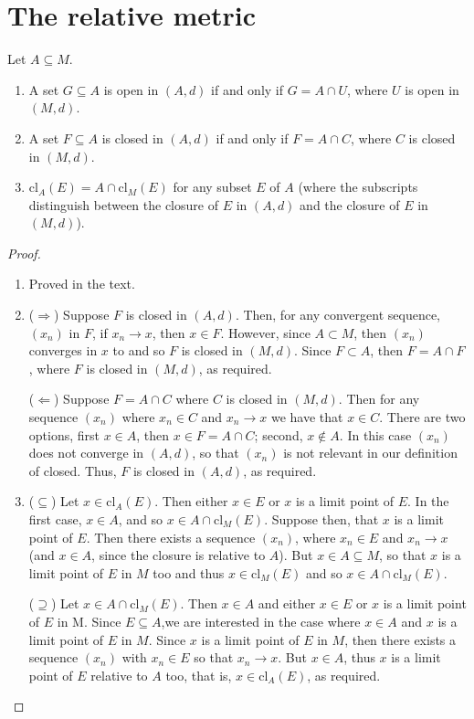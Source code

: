 \section{The relative metric}


\begin{exercise}{61}
Let $A\subseteq M$.
\begin{enumerate}
    \item A set $G\subseteq A$ is open in $(A,d)$ if and only if $G=A\cap U$, where $U$ is open in $(M,d)$.
    \item A set $F\subseteq A$ is closed in $(A,d)$ if and only if $F=A\cap C$, where $C$ is closed in $(M,d)$.
    \item $\text{cl}_A(E)=A\cap\text{cl}_M(E)$ for any subset $E$ of $A$ (where the subscripts distinguish between the closure of $E$ in $(A,d)$ and the closure of $E$ in $(M,d)$).
\end{enumerate}
\end{exercise}
\begin{proof}
\begin{enumerate}
    \item Proved in the text.
    \item ($\Rightarrow$)
    Suppose $F$ is closed in $(A,d)$.
    Then, for any convergent sequence, $(x_n)$ in $F$, if $x_n\to x$, then $x\in F$.
    However, since $A\subset M$, then $(x_n)$ converges in $x$ to and so $F$ is closed in $(M,d)$.
    Since $F\subset A$, then $F=A\cap F$, where $F$ is closed in $(M,d)$, as required.

    ($\Leftarrow$)
    Suppose $F=A\cap C$ where $C$ is closed in $(M,d)$.
    Then for any sequence $(x_n)$ where $x_n\in C$ and $x_n\to x$ we have that $x\in C$.
    There are two options, first $x\in A$, then $x\in F=A\cap C$;
    second, $x\notin A$.
    In this case $(x_n)$ does not converge in $(A,d)$, so that $(x_n)$ is not relevant in our definition of closed. 
    Thus, $F$ is closed in $(A,d)$, as required.
    \item ($\subseteq$)
    Let $x\in \text{cl}_A(E)$.
    Then either $x\in E$ or $x$ is a limit point of $E$.
    In the first case, $x\in A$, and so $x\in A\cap\text{cl}_M(E)$.
    Suppose then, that $x$ is a limit point of $E$.
    Then there exists a sequence $(x_n)$, where $x_n\in E$ and $x_n\to x$ (and $x\in A$, since the closure is relative to $A$).
    But $x\in A\subseteq M$, so that $x$ is a limit point of $E$ in $M$ too and thus $x\in\text{cl}_M(E)$ and so $x\in A\cap\text{cl}_M(E)$.

    ($\supseteq$)
    Let $x\in A\cap\text{cl}_M(E)$.
    Then $x\in A$ and either $x\in E$ or $x$ is a limit point of $E$ in M.
    Since $E\subseteq A$,we are interested in the case where $x\in A$ and $x$ is a limit point of $E$ in $M$.
    Since $x$ is a limit point of $E$ in $M$, then there exists a sequence $(x_n)$ with $x_n\in E$ so that $x_n\to x$.
    But $x\in A$, thus $x$ is a limit point of $E$ relative to $A$ too, that is, $x\in\text{cl}_A(E)$, as required.
\end{enumerate}
\end{proof} 

